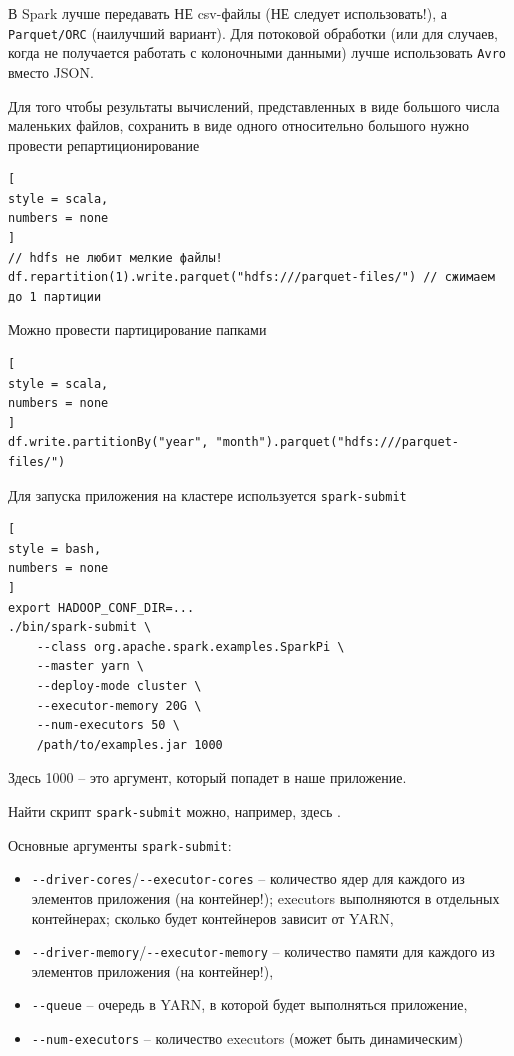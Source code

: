 \documentclass[%
	11pt,
	a4paper,
	utf8,
		]{article}
\begin{document}
В Spark лучше передавать НЕ csv-файлы (НЕ следует использовать!), а \texttt{Parquet/ORC} (наилучший вариант). Для потоковой обработки (или для случаев, когда не получается работать с колоночными данными) лучше использовать \texttt{Avro} вместо JSON.

Для того чтобы результаты вычислений, представленных в виде большого числа маленьких файлов, сохранить в виде одного относительно большого нужно провести репартиционирование
\begin{lstlisting}[
style = scala,
numbers = none	
]
// hdfs не любит мелкие файлы!
df.repartition(1).write.parquet("hdfs:///parquet-files/") // сжимаем до 1 партиции
\end{lstlisting}

Можно провести партицирование папками
\begin{lstlisting}[
style = scala,
numbers = none	
]
df.write.partitionBy("year", "month").parquet("hdfs:///parquet-files/")
\end{lstlisting}

Для запуска приложения на кластере используется \texttt{spark-submit}
\begin{lstlisting}[
style = bash,
numbers = none	
]
export HADOOP_CONF_DIR=...
./bin/spark-submit \
    --class org.apache.spark.examples.SparkPi \
    --master yarn \
    --deploy-mode cluster \
    --executor-memory 20G \
    --num-executors 50 \
    /path/to/examples.jar 1000
\end{lstlisting}

Здесь 1000 -- это аргумент, который попадет в наше приложение.

Найти скрипт \texttt{spark-submit} можно, например, здесь .

Основные аргументы \texttt{spark-submit}:
\begin{itemize}
	\item \verb*|--driver-cores|/\verb*|--executor-cores| -- количество ядер для каждого из элементов приложения (на контейнер!); executors выполняются в отдельных контейнерах; сколько будет контейнеров зависит от YARN,
	
	\item \verb*|--driver-memory|/\verb*|--executor-memory| -- количество памяти для каждого из элементов приложения (на контейнер!),
	
	\item \verb*|--queue| -- очередь в YARN, в которой будет выполняться приложение,
	
	\item \verb*|--num-executors| -- количество executors (может быть динамическим)
\end{itemize}
\end{document}
